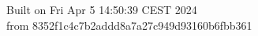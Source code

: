 {\noindent Built on Fri Apr  5 14:50:39 CEST 2024} \\ 
 {\noindent from 8352f1c4c7b2addd8a7a27c949d93160b6fbb361}
